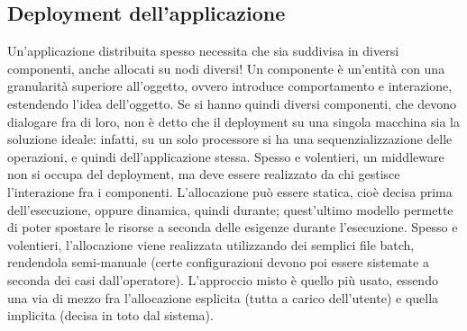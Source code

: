 \subsection{Deployment dell'applicazione}
Un'applicazione distribuita spesso necessita che sia suddivisa in diversi componenti, anche allocati su nodi diversi!
Un componente è un'entità con una granularità superiore all'oggetto, ovvero introduce comportamento e interazione,
estendendo l'idea dell'oggetto.
Se si hanno quindi diversi componenti, che devono dialogare fra di loro, non è detto che il deployment su una singola
macchina sia la soluzione ideale: infatti, su un solo processore si ha una sequenzializzazione delle operazioni, e
quindi dell'applicazione stessa.
Spesso e volentieri, un middleware non si occupa del deployment, ma deve essere realizzato da chi gestisce l'interazione
fra i componenti. L'allocazione può essere statica, cioè decisa prima dell'esecuzione, oppure dinamica, quindi
durante; quest'ultimo modello permette di poter spostare le risorse a seconda delle esigenze durante l'esecuzione.
Spesso e volentieri, l'allocazione viene realizzata utilizzando dei semplici file batch, rendendola semi-manuale (certe
configurazioni devono poi essere sistemate a seconda dei casi dall'operatore).
L'approccio misto è quello più usato, essendo una via di mezzo fra l'allocazione esplicita (tutta a carico dell'utente)
e quella implicita (decisa in toto dal sistema).

